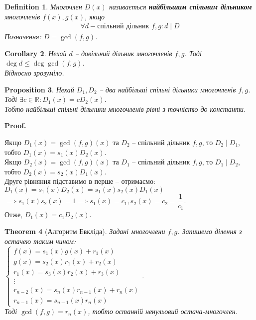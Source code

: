 \documentclass[a4paper, 10pt]{extarticle}
\makeatletter
\def\qed{$\blacksquare$}
\def\qed{$\blacksquare$}
\theoremstyle{theoremdd}
\newtheorem{theorem}{Theorem}[subsection]
\theoremstyle{theoremdd}
\newtheorem{definition}[theorem]{Definition}
\theoremstyle{theoremdd}
\theoremstyle{theoremdd}
\theoremstyle{theoremdd}
\newtheorem{proposition}[theorem]{Proposition}
\theoremstyle{theoremdd}
\theoremstyle{theoremdd}
\theoremstyle{theoremdd}
\newtheorem{corollary}[theorem]{Corollary}
\renewenvironment{proof}[1][Proof.\\]{\par
\pushQED{\hfill \qed}%
\normalfont \topsep6\p@\@plus6\p@\relax
\trivlist
\item\relax
{\bfseries
#1\@addpunct{.}}\hspace\labelsep\ignorespaces
}{%
\popQED\endtrivlist\@endpefalse
}
\makeatother
\begin{document}
\begin{definition}
Многочлен $D(x)$ називається \textbf{найбільшим спільним дільником} многочленів $f(x),g(x)$, якщо
\begin{align*}
\forall d - \text{спільний дільник }f,g: d \mid D
\end{align*}
Позначення: $D = \gcd(f,g)$.
\end{definition}

\begin{corollary}
Нехай $d$ -- довільний дільник многочленів $f,g$. Тоді $\deg d \leq \deg \gcd(f,g)$.\\
\textit{Відносно зрозуміло.}
\end{corollary}

\begin{proposition}
Нехай $D_1, D_2$ -- два найбільші спільні дільники многочленів $f,g$. Тоді $\exists c \in \mathbb{R}: D_1(x) = c D_2(x)$.\\
Тобто найбільші спільні дільники многочленів рівні з точністю до константи.
\end{proposition}

\begin{proof}
Якщо $D_1(x) = \gcd(f,g) (x)$ та $D_2$ -- спільний дільник $f,g$, то $D_2 \mid D_1$, тобто $D_1(x) = s_1(x) D_2(x)$.\\
Якщо $D_2(x) = \gcd(f,g) (x)$ та $D_1$ -- спільний дільник $f,g$, то $D_1 \mid D_2$, тобто $D_2(x) = s_2(x) D_1(x)$.\\
Друге рівняння підставимо в перше -- отримаємо:\\
$D_1(x) = s_1(x) D_2(x) = s_1(x)s_2(x)D_1(x)$\\
$\implies s_1(x)s_2(x) = 1 \implies s_1(x) = c_1, s_2(x) = c_2 = \dfrac{1}{c_1}$.\\
Отже, $D_1(x) = c_1 D_2(x)$.
\end{proof}

\begin{theorem}[Алгоритм Евкліда]
Задані многочлени $f,g$. Запишемо ділення з остачею таким чином:\\
$\begin{cases}
f(x) = s_1(x) g(x) + r_1(x) \\
g(x) = s_2(x) r_1(x) + r_2(x) \\
r_1(x) = s_3(x) r_2(x) + r_3(x) \\
\vdots \\
r_{n-2}(x) = s_n(x)r_{n-1}(x) + r_n(x) \\
r_{n-1}(x) = s_{n+1}(x) r_n(x)
\end{cases}$.\\
Тоді $\gcd(f,g) = r_n(x)$, тобто останній ненульовий остача-многочлен.
\end{theorem}
\end{document}
